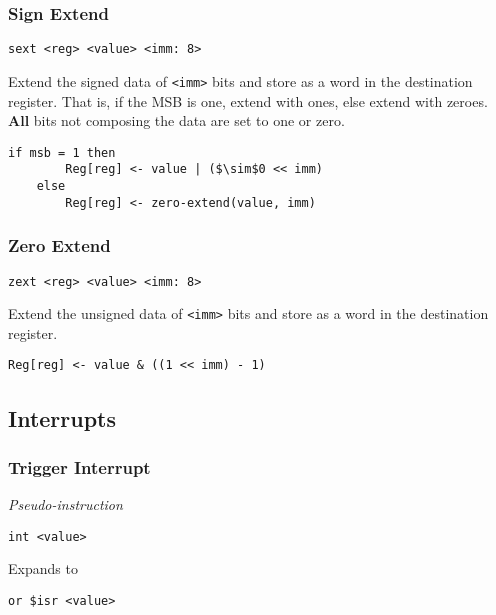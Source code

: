 \subsubsection{Sign Extend}

\begin{lstlisting}[style=assembly]
    sext <reg> <value> <imm: 8>
\end{lstlisting}

Extend the signed data of \texttt{<imm>} bits and store as a word in the destination register.
That is, if the MSB is one, extend with ones, else extend with zeroes.
\textbf{All} bits not composing the data are set to one or zero.

\begin{lstlisting}[style=rtn,mathescape]
    if msb = 1 then
        Reg[reg] <- value | ($\sim$0 << imm)
    else
        Reg[reg] <- zero-extend(value, imm)
\end{lstlisting}

\subsubsection{Zero Extend}

\begin{lstlisting}[style=assembly]
    zext <reg> <value> <imm: 8>
\end{lstlisting}

Extend the unsigned data of \texttt{<imm>} bits and store as a word in the destination register.

\begin{lstlisting}[style=rtn,mathescape]
    Reg[reg] <- value & ((1 << imm) - 1)
\end{lstlisting}

\subsection{Interrupts}

\subsubsection{Trigger Interrupt}

\textit{Pseudo-instruction}

\begin{lstlisting}[style=assembly]
    int <value>
\end{lstlisting}

Expands to

\begin{lstlisting}[style=assembly]
    or $isr <value>
\end{lstlisting}

